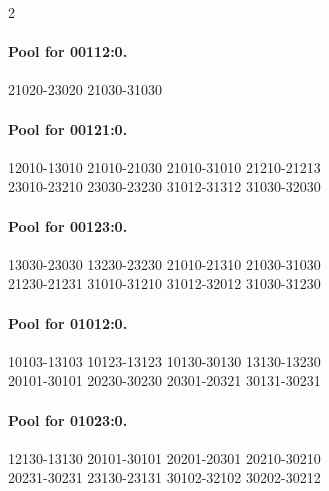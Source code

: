 \begin{multicols}{2}
\paragraph{Pool for 00112:0.}
\begingroup\footnotesize\ttfamily\begin{flushleft}
21020-23020 21030-31030\\
\end{flushleft}\endgroup
\paragraph{Pool for 00121:0.}
\begingroup\footnotesize\ttfamily\begin{flushleft}
12010-13010 21010-21030 21010-31010 21210-21213\\
23010-23210 23030-23230 31012-31312 31030-32030\\
\end{flushleft}\endgroup
\paragraph{Pool for 00123:0.}
\begingroup\footnotesize\ttfamily\begin{flushleft}
13030-23030 13230-23230 21010-21310 21030-31030\\
21230-21231 31010-31210 31012-32012 31030-31230\\
\end{flushleft}\endgroup
\paragraph{Pool for 01012:0.}
\begingroup\footnotesize\ttfamily\begin{flushleft}
10103-13103 10123-13123 10130-30130 13130-13230\\
20101-30101 20230-30230 20301-20321 30131-30231\\
\end{flushleft}\endgroup
\paragraph{Pool for 01023:0.}
\begingroup\footnotesize\ttfamily\begin{flushleft}
12130-13130 20101-30101 20201-20301 20210-30210\\
20231-30231 23130-23131 30102-32102 30202-30212\\
\end{flushleft}\endgroup

\end{multicols}
